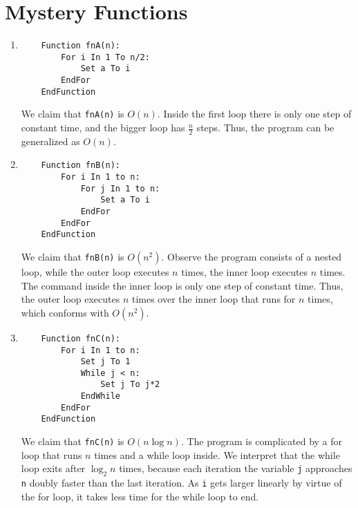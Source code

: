 \documentclass{article}
\begin{document}
    \section{Mystery Functions}

\begin{enumerate}[label=\Alph*]
    \item \begin{lstlisting}
    Function fnA(n):
        For i In 1 To n/2:
            Set a To i
        EndFor
    EndFunction
    \end{lstlisting}

        We claim that \lstinline|fnA(n)| is $O(n)$. Inside the first loop there is only one step of constant time, and the bigger loop has $\frac{n}{2}$ steps. 
        Thus, the program can be generalized as $O(n)$.

    \item \begin{lstlisting}
    Function fnB(n):
        For i In 1 to n:
            For j In 1 to n:
                Set a To i
            EndFor
        EndFor
    EndFunction
    \end{lstlisting}

    We claim that \lstinline|fnB(n)| is $O(n^2)$. Observe the program consists of a nested loop, while the outer loop executes $n$ times, the inner loop executes $n$ times. The command inside the inner loop is only one step of constant time. Thus, the outer loop executes $n$ times over the inner loop that runs for $n$ times, which conforms with $O(n^2)$.

    \item \begin{lstlisting}
    Function fnC(n):
        For i In 1 to n:
            Set j To 1
            While j < n:
                Set j To j*2
            EndWhile
        EndFor
    EndFunction
    \end{lstlisting}

    We claim that \lstinline|fnC(n)| is $O(n\log n)$. The program is complicated by a for loop that runs $n$ times and a while loop inside. We interpret that the while loop exits after $\log_2 n$ times, because each iteration the variable \lstinline|j| approaches \lstinline|n| doubly faster than the last iteration. As \lstinline|i| gets larger linearly by virtue of the for loop, it takes less time for the while loop to end.


\end{enumerate}
\end{document}
